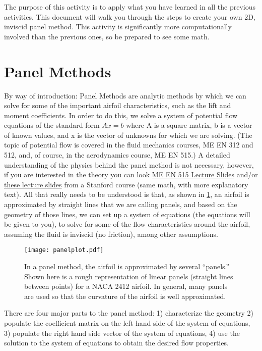 \documentclass{article}%
\begin{document}
The purpose of this activity is to apply what you have learned in all the previous activities. This document will walk you through the steps to create your own 2D, inviscid panel method. This activity is significantly more computationally involved than the previous ones, so be prepared to see some math.

\section*{Panel Methods}

By way of introduction: Panel Methods are analytic methods by which we can solve for some of the important airfoil characteristics, such as the lift and moment coefficients. In order to do this, we solve a system of potential flow equations of the standard form \(Ax=b\) where A is a square matrix, b is a vector of known values, and x is the vector of unknowns for which we are solving. (The topic of potential flow is covered in the fluid mechanics courses, ME EN 312 and 512, and, of course, in the aerodynamics course, ME EN 515.) A detailed understanding of the physics behind the panel method is not necessary, however, if you are interested in the theory you can look \href{http://flowlab.groups.et.byu.net/me515/slides/9-panel.pdf}{ME EN 515 Lecture Slides} and/or  \href{http://adl.stanford.edu/aa210b/Lecture_Notes_files/Hess-Smith.pdf}{these lecture slides} from a Stanford course (same math, with more explanatory text). All that really needs to be understood is that, as shown in \cref{fig:panelplot}, an airfoil is approximated by straight lines that we are calling panels, and based on the geometry of those lines, we can set up a system of equations (the equations will be given to you), to solve for some of the flow characteristics around the airfoil, assuming the fluid is inviscid (no friction), among other assumptions.

\begin{figure}[h!]
	\centering
	\texttt{[image: panelplot.pdf]}
	\caption{In a panel method, the airfoil is approximated by several ``panels.'' Shown here is a rough representation of linear panels (straight lines between points) for a NACA 2412 airfoil. In general, many panels are used so that the curvature of the airfoil is well approximated.}
	\label{fig:panelplot}
\end{figure}

There are four major parts to the panel method: 1) characterize the geometry 2) populate the coefficient matrix on the left hand side of the system of equations, 3) populate the right hand side vector of the system of equations, 4) use the solution to the system of equations to obtain the desired flow properties.
\end{document}
